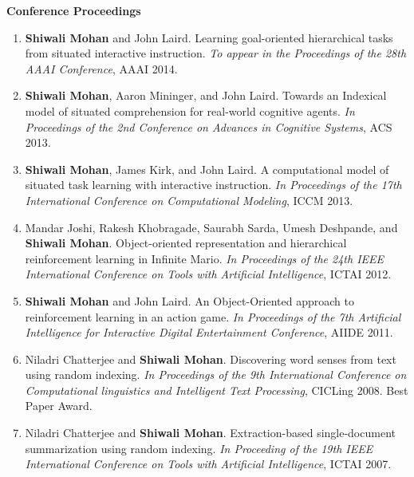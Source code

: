 \documentclass[margin,line,11pt]{res}
\begin{document}
\begin{resume}
\textbf{Conference Proceedings}
\begin{enumerate}[label=\lbrack C\arabic*\rbrack,leftmargin=*]
\item \textbf{Shiwali Mohan} and John Laird. Learning goal-oriented hierarchical tasks from situated interactive instruction. \emph{To appear in the Proceedings of the 28th AAAI Conference}, AAAI 2014.
\item \textbf{Shiwali Mohan}, Aaron Mininger, and John Laird. Towards an Indexical model of situated comprehension for real-world cognitive agents. \emph{In Proceedings of the 2nd Conference on Advances in Cognitive Systems}, ACS 2013.
\item \textbf{Shiwali Mohan}, James Kirk, and John Laird. A computational model of situated task learning with interactive instruction. \emph{In Proceedings of the 17th International Conference on Computational Modeling}, ICCM 2013.
\item Mandar Joshi, Rakesh Khobragade, Saurabh Sarda, Umesh Deshpande, and \textbf{Shiwali Mohan}. Object-oriented
representation and hierarchical reinforcement learning in Infinite Mario. \emph{In Proceedings of the 24th IEEE
International Conference on Tools with Artificial Intelligence}, ICTAI 2012.
\item \textbf{Shiwali Mohan} and John Laird. An Object-Oriented approach to reinforcement learning in an action game.
\emph{In Proceedings of the 7th Artificial Intelligence for Interactive Digital Entertainment Conference}, AIIDE 2011.
\item Niladri Chatterjee and \textbf{Shiwali Mohan}. Discovering word senses from text using random indexing. \emph{In
Proceedings of the 9th International Conference on Computational linguistics and Intelligent Text Processing},
CICLing 2008. Best Paper Award.
\item Niladri Chatterjee and \textbf{Shiwali Mohan}. Extraction-based single-document summarization using random
indexing. \emph{In Proceeding of the 19th IEEE International Conference on Tools with Artificial Intelligence}, ICTAI
2007.
\end{enumerate}


\end{resume}
\end{document}
